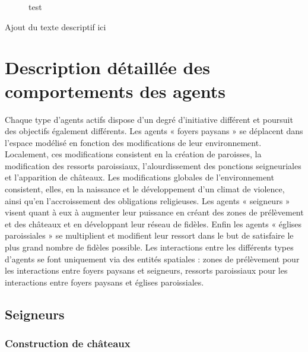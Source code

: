 \begin{figure}[H]
	
	\caption{test}
\end{figure}

Ajout du texte descriptif ici

	
\section[Comportements des agents]{Description détaillée des comportements des agents}

Chaque type d'agents actifs dispose d'un degré d'initiative différent et poursuit des objectifs également différents.
Les agents « foyers paysans » se déplacent dans l'espace modélisé en fonction des modifications de leur environnement.
Localement, ces modifications consistent en la création de paroisses, la modification des ressorts paroissiaux, l'alourdissement des ponctions seigneuriales et l'apparition de châteaux.
Les modifications globales de l'environnement consistent, elles, en la naissance et le développement d'un climat de violence, ainsi qu'en l'accroissement des obligations religieuses.
Les agents « seigneurs » visent quant à eux à augmenter leur puissance en créant des zones de prélèvement et des châteaux et en développant leur réseau de fidèles.
Enfin les agents « églises paroissiales » se multiplient et modifient leur ressort dans le but de satisfaire le plus grand nombre de fidèles possible.
Les interactions entre les différents types d'agents se font uniquement via des entités spatiales : zones de prélèvement pour les interactions entre foyers paysans et seigneurs, ressorts paroissiaux pour les interactions entre foyers paysans et églises paroissiales.

\subsection{Seigneurs}

\subsubsection{Construction de châteaux}

